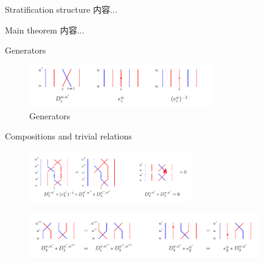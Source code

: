 \documentclass{beamer}
\numberwithin{equation}{section}
\theoremstyle{plain}
\numberwithin{equation}{section}
\theoremstyle{remark}
\begin{document}
\begin{frame}[fragile]{Stratification structure}
内容...
\end{frame}

\begin{frame}[fragile]{Main theorem}
内容...
\end{frame}

\begin{frame}[fragile]{Generators}
\begin{figure}[ht]
  \vspace{0cm}
    \centering  \includegraphics[width=8cm]{strands/generators.pdf}
      \caption{Generators}
      \label{fig:generators}        
\end{figure}
\end{frame}

\begin{frame}[fragile]{Compositions and trivial relations}
\begin{figure}[ht]
  \vspace{0cm}
    \centering  \includegraphics[width=7cm]{strands/glue_vertically.pdf}
      \label{fig:glue_vertically}        
\end{figure}

\begin{figure}[ht]
  \vspace{0cm}
    \centering  \includegraphics[width=10cm]{strands/clear_relations.pdf}
      \label{fig:clear_relations}        
\end{figure}
\end{frame}
\end{document}
